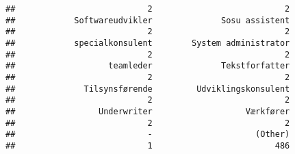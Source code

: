 \documentclass[]{article}
\newenvironment{Shaded}{\begin{snugshade}}{\end{snugshade}}
\newcommand{\KeywordTok}[1]{\textcolor[rgb]{0.13,0.29,0.53}{\textbf{{#1}}}}
\newcommand{\StringTok}[1]{\textcolor[rgb]{0.31,0.60,0.02}{{#1}}}
\newcommand{\NormalTok}[1]{{#1}}
\begin{document}
\begin{verbatim}
##                           2                           2 
##            Softwareudvikler              Sosu assistent 
##                           2                           2 
##            specialkonsulent        System administrator 
##                           2                           2 
##                   teamleder              Tekstforfatter 
##                           2                           2 
##              Tilsynsførende         Udviklingskonsulent 
##                           2                           2 
##                 Underwriter                   Værkfører 
##                           2                           2 
##                           -                     (Other) 
##                           1                         486
\end{verbatim}

\begin{Shaded}
\end{Shaded}
\end{document}
